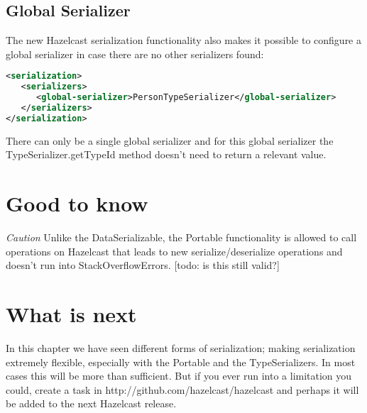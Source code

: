 \subsection{Global Serializer}
The new Hazelcast serialization functionality also makes it possible to configure a global serializer in case there are no other serializers found:
\begin{lstlisting}[language=xml]
<serialization>
   <serializers>
      <global-serializer>PersonTypeSerializer</global-serializer>
   </serializers>
</serialization>
\end{lstlisting}
There can only be a single global serializer and for this global serializer the TypeSerializer.getTypeId method doesn't need to return a relevant value.

\section{Good to know}

\emph{Caution} Unlike the DataSerializable, the Portable functionality is allowed to call operations on Hazelcast that leads to new serialize/deserialize operations and doesn't run into StackOverflowErrors. [todo: is this still valid?]

\section{What is next}
In this chapter we have seen different forms of serialization; making serialization extremely flexible, especially with the Portable and the TypeSerializers. In most cases this will be more than sufficient. But if you ever run into a limitation you could, create a task in http://github.com/hazelcast/hazelcast and perhaps it will be added to the next Hazelcast release.